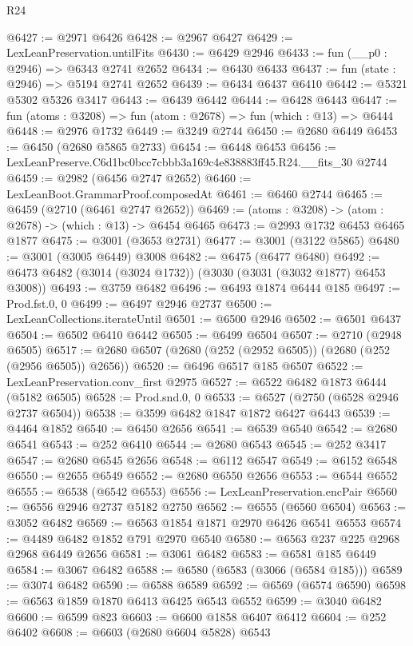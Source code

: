 \begin{lexlean}{R24}
\begin{coremodule}
@6427 := @2971 @6426
@6428 := @2967 @6427
@6429 := LexLeanPreservation.untilFits
@6430 := @6429 @2946
@6433 := fun (__p0 : @2946) => @6343 @2741 @2652
@6434 := @6430 @6433
@6437 := fun (state : @2946) => @5194 @2741 @2652
@6439 := @6434 @6437 @6410
@6442 := @5321 @5302 @5326 @3417
@6443 := @6439 @6442
@6444 := @6428 @6443
@6447 := fun (atoms : @3208) => fun (atom : @2678) => fun (which : @13) => @6444
@6448 := @2976 @1732
@6449 := @3249 @2744
@6450 := @2680 @6449
@6453 := @6450 (@2680 @5865 @2733)
@6454 := @6448 @6453
@6456 := LexLeanPreserve.C6d1bc0bcc7cbbb3a169c4e838883ff45.R24.__fits_30 @2744
@6459 := @2982 (@6456 @2747 @2652)
@6460 := LexLeanBoot.GrammarProof.composedAt
@6461 := @6460 @2744
@6465 := @6459 (@2710 (@6461 @2747 @2652))
@6469 := (atoms : @3208) -> (atom : @2678) -> (which : @13) -> @6454 @6465
@6473 := @2993 @1732 @6453 @6465 @1877
@6475 := @3001 (@3653 @2731)
@6477 := @3001 (@3122 @5865)
@6480 := @3001 (@3005 @6449) @3008
@6482 := @6475 (@6477 @6480)
@6492 := @6473 @6482 (@3014 (@3024 @1732)) (@3030 (@3031 (@3032 @1877) @6453 @3008))
@6493 := @3759 @6482
@6496 := @6493 @1874 @6444 @185
@6497 := Prod.fst.{0, 0}
@6499 := @6497 @2946 @2737
@6500 := LexLeanCollections.iterateUntil
@6501 := @6500 @2946
@6502 := @6501 @6437
@6504 := @6502 @6410 @6442
@6505 := @6499 @6504
@6507 := @2710 (@2948 @6505)
@6517 := @2680 @6507 (@2680 (@252 (@2952 @6505)) (@2680 (@252 (@2956 @6505)) @2656))
@6520 := @6496 @6517 @185 @6507
@6522 := LexLeanPreservation.conv_first @2975
@6527 := @6522 @6482 @1873 @6444 (@5182 @6505)
@6528 := Prod.snd.{0, 0}
@6533 := @6527 (@2750 (@6528 @2946 @2737 @6504))
@6538 := @3599 @6482 @1847 @1872 @6427 @6443
@6539 := @4464 @1852
@6540 := @6450 @2656
@6541 := @6539 @6540
@6542 := @2680 @6541
@6543 := @252 @6410
@6544 := @2680 @6543
@6545 := @252 @3417
@6547 := @2680 @6545 @2656
@6548 := @6112 @6547
@6549 := @6152 @6548
@6550 := @2655 @6549
@6552 := @2680 @6550 @2656
@6553 := @6544 @6552
@6555 := @6538 (@6542 @6553)
@6556 := LexLeanPreservation.encPair
@6560 := @6556 @2946 @2737 @5182 @2750
@6562 := @6555 (@6560 @6504)
@6563 := @3052 @6482
@6569 := @6563 @1854 @1871 @2970 @6426 @6541 @6553
@6574 := @4489 @6482 @1852 @791 @2970 @6540
@6580 := @6563 @237 @225 @2968 @2968 @6449 @2656
@6581 := @3061 @6482
@6583 := @6581 @185 @6449
@6584 := @3067 @6482
@6588 := @6580 (@6583 (@3066 (@6584 @185)))
@6589 := @3074 @6482
@6590 := @6588 @6589
@6592 := @6569 (@6574 @6590)
@6598 := @6563 @1859 @1870 @6413 @6425 @6543 @6552
@6599 := @3040 @6482
@6600 := @6599 @823
@6603 := @6600 @1858 @6407 @6412
@6604 := @252 @6402
@6608 := @6603 (@2680 @6604 @5828) @6543

\end{coremodule}
\end{lexlean}
